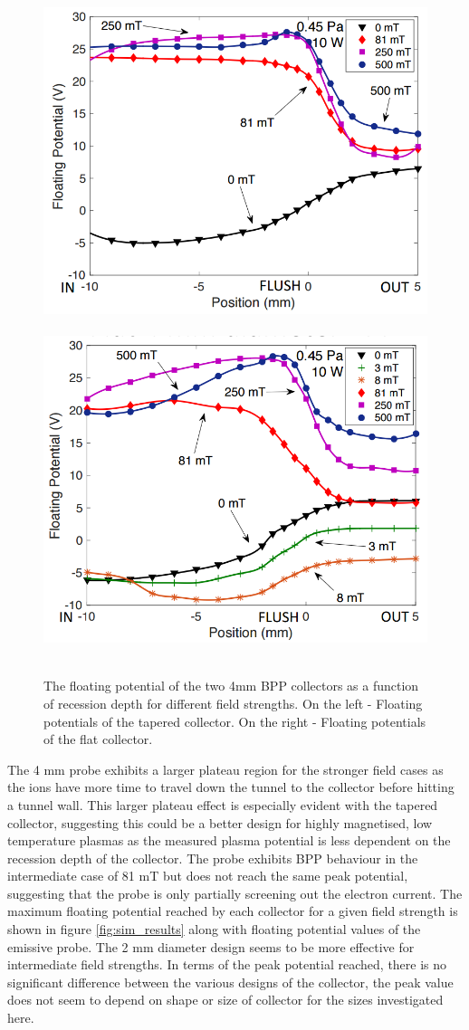 \begin{figure}[H]
	\hbox{%
		\includegraphics[width=.5\textwidth]{tap_4mm.png}%
	}%
	\hbox{%
		\includegraphics[width=.5\textwidth]{flat_4mm.png}%
	}%
	
	\noindent
	\parbox{.5\textwidth}{%
		\centering
		
	}%
	\hfil
	\parbox{.5\textwidth}{%
		\centering
		
	}%
	
	\caption{The floating potential of the two 4mm BPP collectors as a function of recession depth for different field strengths. On the left - Floating potentials of the tapered collector. On the right - Floating potentials of the flat collector.}
	\label{fig:4mm}
\end{figure} The 4 mm probe exhibits a larger plateau region for the stronger field cases as the ions have more time to travel down the tunnel to the collector before hitting a tunnel wall. This larger plateau effect is especially  evident with the tapered collector, suggesting this could be a better design for highly magnetised, low temperature plasmas as the measured plasma potential is less dependent on the recession depth of the collector. The probe exhibits BPP behaviour in the intermediate case of 81 mT but does not reach the same peak potential, suggesting that the probe is only partially screening out the electron current. The maximum floating potential reached by each collector for a given field strength is shown in figure \ref{fig:sim_results} along with floating potential values of the emissive probe. The 2 mm diameter design seems to be more effective for intermediate field strengths. In terms of the peak potential reached, there is no significant difference between the various designs of the collector, the peak value does not seem to depend on shape or size of collector for the sizes investigated here. 

